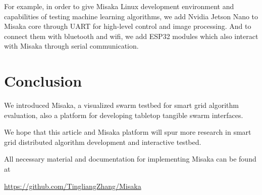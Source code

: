 \documentclass[conference]{IEEEtran}
\begin{document}
For example, in order to give Misaka Linux development environment and capabilities of testing machine learning algorithms, we add Nvidia Jetson Nano to Misaka core through UART for high-level control and image processing. And to connect them with bluetooth and wifi, we add ESP32 modules which also interact with Misaka through serial communication. 









\section{Conclusion}

We introduced Misaka, a visualized swarm testbed for smart grid algorithm evaluation, also a platform for developing tabletop tangible swarm interfaces.

We hope that this article and Misaka platform will spur more research in smart grid distributed algorithm development and interactive testbed.

All necessary material and documentation for implementing Misaka can be found at

\href{https://github.com/TingliangZhang/Misaka}{https://github.com/TingliangZhang/Misaka}



\end{document}
